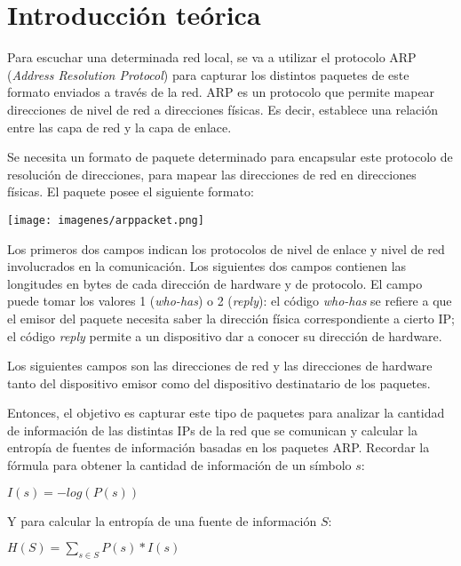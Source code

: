\section{Introducci\'on te\'orica}

Para escuchar una determinada red local, se va a utilizar el protocolo ARP (\emph{Address Resolution 
Protocol}) para capturar los distintos paquetes de este formato enviados a trav\'es de la red. ARP 
es un protocolo que permite mapear direcciones de nivel de red a direcciones f\'isicas. Es decir, 
establece una relaci\'on entre las capa de red y la capa de enlace.

Se necesita un formato de paquete determinado para encapsular este protocolo de resoluci\'on de 
direcciones, para mapear las direcciones de red en direcciones f\'isicas. El paquete posee el 
siguiente formato:

\begin{center}
\texttt{[image: imagenes/arppacket.png]}
\end{center}

Los primeros dos campos indican los protocolos de nivel de enlace y nivel de red involucrados en la
comunicaci\'on. Los siguientes dos campos contienen las longitudes en bytes de cada direcci\'on 
de hardware y de protocolo. El campo \verb@Oper@ puede tomar los valores 1 (\emph{who-has}) o 2 
(\emph{reply}): el c\'odigo \emph{who-has} se refiere a que el emisor del paquete necesita saber
la direcci\'on f\'isica correspondiente a cierto IP; el c\'odigo \emph{reply} permite a un 
dispositivo dar a conocer su direcci\'on de hardware.

Los siguientes campos son las direcciones de red y las direcciones de hardware tanto del dispositivo 
emisor como del dispositivo destinatario de los paquetes. 

Entonces, el objetivo es capturar este tipo de paquetes para analizar la cantidad de informaci\'on
de las distintas IPs de la red que se comunican y calcular la entrop\'ia de fuentes de informaci\'on
basadas en los paquetes ARP. Recordar la f\'ormula para obtener la cantidad de informaci\'on de un 
s\'imbolo $s$:

$I(s) = -log(P(s))$

Y para calcular la entrop\'ia de una fuente de informaci\'on $S$:

$H(S) = \displaystyle \sum_{s\in S} P(s) * I(s)$




